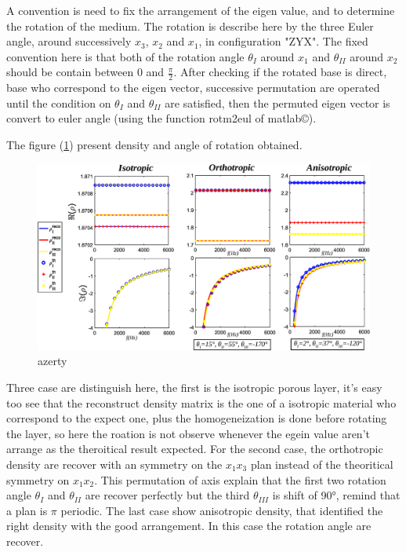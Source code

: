 \documentclass{article}
\begin{document}
    A convention is need to fix the arrangement of the eigen value, and to determine the rotation of the medium. The rotation is describe here by the three Euler angle, around successively $x_3$, $x_2$ and $x_1$, in configuration "ZYX". The fixed convention here is that both of  the rotation angle $\theta_I$ around $x_1$ and $\theta_{II}$ around $x_2$ should be contain between $0$ and $\frac{\pi}{2}$. After checking if the rotated base is direct, base who correspond to the eigen vector, successive permutation are operated until the condition on $\theta_I$ and $\theta_{II}$ are satisfied, then the permuted eigen vector is convert to euler angle (using the function rotm2eul of matlab\copyright).
    
    The figure (\ref{Grph_rho_dir}) present density and angle of rotation obtained.

    \begin{figure}[ht!]
        \centering
        \includegraphics[scale=0.4]{Density_dir.eps}
        \caption{azerty}
        \label{Grph_rho_dir}
    \end{figure}
    
    Three case are distinguish here, the first is the isotropic porous layer, it's easy too see that the reconstruct density matrix is the one of a isotropic material who correspond to the expect one, plus the homogeneization is done before rotating the layer, so here the roation is not observe whenever the egein value aren't arrange as the theroitical result expected.  For the second case, the orthotropic density are recover with an symmetry on the $x_1x_3$ plan instead of the theoritical symmetry on $x_1x_2$. This permutation of axis explain that the first two rotation angle $\theta_I$ and $\theta_{II}$ are recover perfectly but the third $\theta_{III}$ is shift of 90°, remind that a plan is $\pi$ periodic. The last case show anisotropic density, that identified the right density with the good arrangement. In this case the rotation angle are recover. 
    
\end{document}
